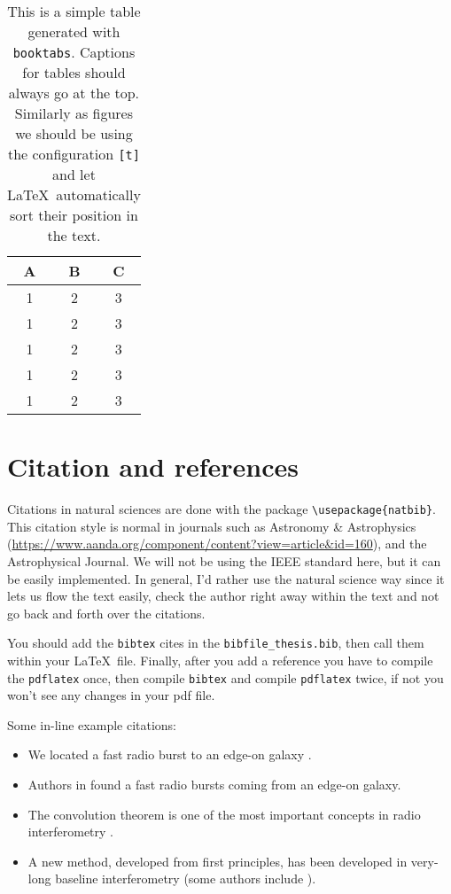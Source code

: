 \begin{table}[t]
  \centering
  \caption[My first table]{This is a simple table generated with \texttt{booktabs}. Captions for tables should always go at the top. Similarly as figures we should be using the configuration \texttt{[t]} and let \LaTeX\ automatically sort their position in the text.}
  \label{tab:my_table}
  \begin{tabular}{ccc}
    \toprule
    \textbf{A} & \textbf{B} & \textbf{C} \\ \midrule
    1 & 2 & 3 \\
    1 & 2 & 3 \\
    1 & 2 & 3 \\
    1 & 2 & 3 \\
    1 & 2 & 3 \\
    \bottomrule
  \end{tabular}
\end{table}

\section{Citation and references}
\label{sec:citations}

Citations in natural sciences are done with the package \verb|\usepackage{natbib}|. This citation style is normal in journals such as Astronomy \& Astrophysics (\url{https://www.aanda.org/component/content?view=article&id=160}), and the Astrophysical Journal. We will not be using the IEEE standard here, but it can be easily implemented. In general, I'd rather use the natural science way since it lets us flow the text easily, check the author right away within the text and not go back and forth over the citations.

You should add the \texttt{bibtex} cites in the \texttt{bibfile\_thesis.bib}, then call them within your \LaTeX\ file. Finally, after you add a reference you have to compile the \texttt{pdflatex} once, then compile \texttt{bibtex} and compile \texttt{pdflatex} twice, if not you won't see any changes in your pdf file.

Some in-line example citations:
\begin{itemize}
  \item We located a fast radio burst to an edge-on galaxy \citep{2024NatAs...8.1429C}.
  \item Authors in \citet{2024NatAs...8.1429C} found a fast radio bursts coming from an edge-on galaxy.
  \item The convolution theorem is one of the most important concepts in radio interferometry \citep[see][chapter~3]{1965ftia.book.....B}.
  \item A new method, developed from first principles, has been developed in very-long baseline interferometry (some authors include \citealt{1965ftia.book.....B}).
\end{itemize}

